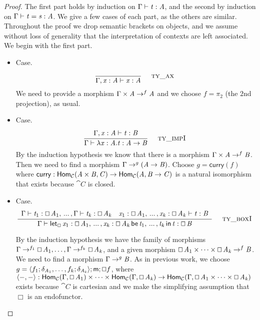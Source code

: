 \begin{proof}
  The first part holds by induction on $\Gamma  \vdash  \TLLnt{t}  \TLLsym{:}  \TLLnt{A}$, and the
  second by induction on $ \Gamma  \vdash  \TLLnt{t}  =  \TLLnt{s}  :  \TLLnt{A} $.  We give a few cases of
  each part, as the others are similar.  Throughout the proof we
  drop semantic brackets on objects, and we assume without loss of
  generality that the interpretation of contexts are left associated.
  We begin with the first part.

  \begin{itemize}
  \item[] Case.\\
    \[
    \TLLdruletyXXax{}
    \]
    We need to provide a morphism $\Gamma \times \TLLnt{A} \mto^{f}
    \TLLnt{A}$ and we choose $f = \pi_2$ (the $2$nd projection), as usual.

    \item[] Case.\\
    \[
    \TLLdruletyXXimpI{}
    \]
    By the induction hypothesis we know that there is a morphism
    $\Gamma \times \TLLnt{A} \mto^f \TLLnt{B}$.  Then we need  to find a
    morphism $\Gamma \mto^{g} (\TLLnt{A}  \to  \TLLnt{B})$.  Choose $g =
    \mathsf{curry}(f)$ where $\mathsf{curry} :
    \mathsf{Hom}_{\cat{C}}( \TLLnt{A}  \times  \TLLnt{B} ,\TLLnt{C}) \mto
    \mathsf{Hom}_{\cat{C}}(\TLLnt{A},\TLLnt{B}  \to  \TLLnt{C})$ is a natural isomorphism
    that exists because $\cat{C}$ is closed.

  \item[] Case.\\
    \[
    \TLLdruletyXXboxI{}
    \]

    By the induction hypothesis we have the family of morphisms $\Gamma
    \mto^{f_1} \Box \, \TLLnt{A_{{\mathrm{1}}}}, \ldots, \Gamma \mto^{f_k} \Box \, \TLLnt{A_{\TLLmv{k}}}$, and a given morphism
    $\Box \, \TLLnt{A_{{\mathrm{1}}}} \times \cdots \times \Box \, \TLLnt{A_{\TLLmv{k}}} \mto^f \TLLnt{B}$.  We need 
     to find a morphism $\Gamma \mto^{g} \TLLnt{B}$.  As in previous work, we choose $g =
    \langle f_1;\delta_{\TLLnt{A_{{\mathrm{1}}}}},\ldots,f_k;\delta_{\TLLnt{A_{\TLLmv{k}}}} \rangle;\mathsf{m};\Box f$, where $\langle -,-\rangle :
    \mathsf{Hom}_{\cat{C}}(\Gamma,\Box \, \TLLnt{A_{{\mathrm{1}}}}) \times \cdots \times
    \mathsf{Hom}_{\cat{C}}(\Gamma,\Box \, \TLLnt{A_{\TLLmv{k}}}) \mto \mathsf{Hom}_{\cat{C}}(\Gamma,\Box \, \TLLnt{A_{{\mathrm{1}}}}
    \times \cdots \times \Box \, \TLLnt{A_{\TLLmv{k}}})$ exists because $\cat{C}$ is cartesian and we make the simplifying assumption that $\Box$ is an endofunctor.


\end{itemize}
\end{proof}
